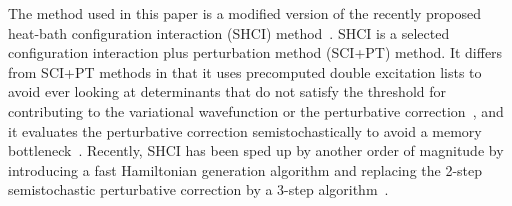 %

The method used in this paper is a modified version of the recently proposed heat-bath configuration interaction (SHCI) method~\cite{HolTubUmr-JCTC-16,ShaHolJeaAlaUmr-JCTC-17,LiOttHolShaUmr-JCP-18}.
SHCI is a selected configuration interaction plus perturbation method (SCI+PT) method.
It differs from SCI+PT methods in that it uses precomputed double excitation lists to avoid ever looking
at determinants that do not satisfy the threshold for contributing to the variational wavefunction
or the perturbative correction~\cite{HolTubUmr-JCTC-16}, and it evaluates the perturbative
correction semistochastically to avoid a memory bottleneck~\cite{ShaHolJeaAlaUmr-JCTC-17}.
Recently, SHCI has been sped up by another order of magnitude by introducing a fast Hamiltonian generation algorithm and replacing the 2-step semistochastic perturbative correction by a 3-step algorithm~\cite{li2018fast}.

